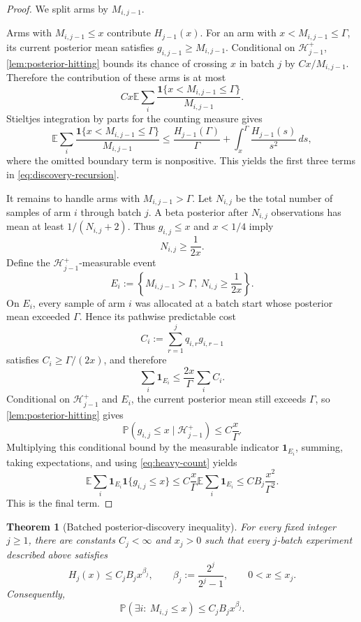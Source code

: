 \documentclass[11pt,letterpaper]{article}
\numberwithin{equation}{section}
\newtheorem{theorem}{Theorem}[section]
\theoremstyle{definition}
\theoremstyle{remark}
\newcommand{\E}{\mathbb{E}}
\newcommand{\Pp}{\mathbb{P}}
\newcommand{\1}{\mathbf{1}}
\newcommand{\Hh}{\mathcal{H}}
\begin{document}
\begin{proof}
We split arms by $M_{i,j-1}$.

Arms with $M_{i,j-1}\le x$ contribute $H_{j-1}(x)$.  For an arm with
$x<M_{i,j-1}\le\Gamma$, its current posterior mean satisfies
$g_{i,j-1}\ge M_{i,j-1}$.  Conditional on $\Hh_{j-1}^{+}$,
\cref{lem:posterior-hitting} bounds its chance of crossing $x$ in batch $j$ by
$Cx/M_{i,j-1}$.  Therefore the contribution of these arms is at most
\[
  Cx\E\sum_i
  \frac{\1\{x<M_{i,j-1}\le\Gamma\}}{M_{i,j-1}}.
\]
Stieltjes integration by parts for the counting measure gives
\[
  \E\sum_i
  \frac{\1\{x<M_{i,j-1}\le\Gamma\}}{M_{i,j-1}}
  \le \frac{H_{j-1}(\Gamma)}{\Gamma}
  +\int_x^\Gamma\frac{H_{j-1}(s)}{s^2}\,ds,
\]
where the omitted boundary term is nonpositive.  This yields the first three
terms in \cref{eq:discovery-recursion}.

It remains to handle arms with $M_{i,j-1}>\Gamma$.  Let $N_{i,j}$ be the total
number of samples of arm $i$ through batch $j$.  A beta posterior after
$N_{i,j}$ observations has mean at least $1/(N_{i,j}+2)$.  Thus
$g_{i,j}\le x$ and $x<1/4$ imply
\[
  N_{i,j}\ge \frac{1}{2x}.
\]
Define the $\Hh_{j-1}^{+}$-measurable event
\[
  E_i:=\left\{M_{i,j-1}>\Gamma,
              \ N_{i,j}\ge\frac{1}{2x}\right\}.
\]
On $E_i$, every sample of arm $i$ was allocated at a batch start whose posterior
mean exceeded $\Gamma$.  Hence its pathwise predictable cost
\[
  C_i:=\sum_{r=1}^{j}q_{i,r}g_{i,r-1}
\]
satisfies $C_i\ge\Gamma/(2x)$, and therefore
\begin{equation}\label{eq:heavy-count}
  \sum_i\1_{E_i}
  \le \frac{2x}{\Gamma}\sum_i C_i.
\end{equation}
Conditional on $\Hh_{j-1}^{+}$ and $E_i$, the current posterior mean still
exceeds $\Gamma$, so \cref{lem:posterior-hitting} gives
\[
  \Pp(g_{i,j}\le x\mid\Hh_{j-1}^{+})
  \le C\frac{x}{\Gamma}.
\]
Multiplying this conditional bound by the measurable indicator $\1_{E_i}$,
summing, taking expectations, and using \cref{eq:heavy-count} yields
\[
  \E\sum_i\1_{E_i}\1\{g_{i,j}\le x\}
  \le C\frac{x}{\Gamma}\E\sum_i\1_{E_i}
  \le CB_j\frac{x^2}{\Gamma^2}.
\]
This is the final term.
\end{proof}

\begin{theorem}[Batched posterior-discovery inequality]\label{thm:batched-discovery}
For every fixed integer $j\ge1$, there are constants $C_j<\infty$ and
$x_j>0$ such that every $j$-batch experiment described above satisfies
\begin{equation}\label{eq:discovery-bound}
  H_j(x)\le C_j B_j x^{\beta_j},
  \qquad
  \beta_j:=\frac{2^j}{2^j-1},
  \qquad 0<x\le x_j.
\end{equation}
Consequently,
\begin{equation}\label{eq:discovery-prob}
  \Pp\!\left(\exists i:\ M_{i,j}\le x\right)
  \le C_j B_jx^{\beta_j}.
\end{equation}
\end{theorem}
\end{document}

